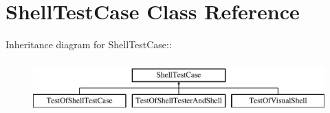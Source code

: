 \hypertarget{class_shell_test_case}{
\section{ShellTestCase Class Reference}
\label{class_shell_test_case}
}
Inheritance diagram for ShellTestCase::\begin{figure}[H]
\begin{center}
\leavevmode
\includegraphics[height=2cm]{class_shell_test_case}
\end{center}
\end{figure}
